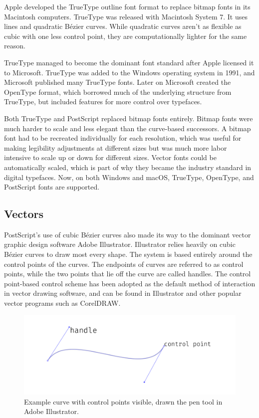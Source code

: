 \documentclass[12pt,letterpaper]{article}
\begin{document}
Apple developed the TrueType outline font format to replace bitmap fonts in its Macintosh computers. TrueType was released with Macintosh System 7. It uses lines and quadratic B\'ezier curves. While quadratic curves aren’t as flexible as cubic with one less control point, they are computationally lighter for the same reason.

TrueType managed to become the dominant font standard after Apple licensed it to Microsoft. TrueType was added to the Windows operating system in 1991, and Microsoft published many TrueType fonts. Later on Microsoft created the OpenType format, which borrowed much of the underlying structure from TrueType, but included features for more control over typefaces. 

Both TrueType and PostScript replaced bitmap fonts entirely. Bitmap fonts were much harder to scale and less elegant than the curve-based successors. A bitmap font had to be recreated individually for each resolution, which was useful for making legibility adjustments at different sizes but was much more labor intensive to scale up or down for different sizes. Vector fonts could be automatically scaled, which is part of why they became the industry standard in digital typefaces. Now, on both Windows and macOS, TrueType, OpenType, and PostScript fonts are supported.


\subsection{Vectors}

PostScript’s use of cubic B\'ezier curves also made its way to the dominant vector graphic design software Adobe Illustrator. Illustrator relies heavily on cubic B\'ezier curves to draw most every shape. The system is based entirely around the control points of the curves. The endpoints of curves are referred to as control points, while the two points that lie off the curve are called handles. The control point-based control scheme has been adopted as the default method of interaction in vector drawing software, and can be found in Illustrator and other popular vector programs such as CorelDRAW.

\begin{figure}[H]
\centering
\includegraphics[width=\textwidth]{illustrator-ex}
\caption{Example curve with control points visible, drawn the pen tool in Adobe Illustrator.}
\end{figure}
\end{document}
